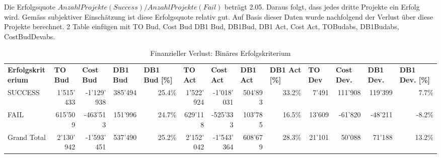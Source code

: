 \newline
Die Erfolgsquote $Anzahl Projekte (Success)/Anzahl Projekte(Fail)$ beträgt 2.05. Daraus folgt, dass jedes dritte Projekte ein Erfolg wird. Gemäss subjektiver Einschätzung ist diese Erfolgsquote relativ gut. Auf Basis dieser Daten wurde nachfolgend der Verlust über diese Projekte berechnet. 
2 Table einfügen mit TO Bud, Cost Bud DB1 Bud, DB1Bud, DB1 Act, Cost Act, TOBudabs, DB1Budabs, CostBudDevabs.
\begin{table}[htbp]
	\centering
	\caption{Finanzieller Verlust: Binäres Erfolgskriterium }
	\begin{tabular}{lrrrrrrrrrrrr}
		\textbf{Erfolgskriterium} & \multicolumn{1}{l}{\textbf{TO Bud}} & \multicolumn{1}{l}{\textbf{Cost Bud}} & \multicolumn{1}{l}{\textbf{DB1 Bud}} & \multicolumn{1}{l}{\textbf{DB1 Bud [\%]}} & \multicolumn{1}{l}{\textbf{TO Act}} & \multicolumn{1}{l}{\textbf{Cost Act}} & \multicolumn{1}{l}{\textbf{DB1 Act}} & \multicolumn{1}{l}{\textbf{DB1 Act [\%]}} & \multicolumn{1}{l}{\textbf{TO Dev}} & \multicolumn{1}{l}{\textbf{Cost Dev.}} & \multicolumn{1}{l}{\textbf{DB1 Dev.}} & \multicolumn{1}{l}{\textbf{DB1 Dev. [\%]}} \\
		SUCCESS & 1'515'433 & -1'129'938 & 385'494 & 25.4\% & 1'522'924 & -1'018'031 & 504'893 & 33.2\% & 7'491 & 111'908 & 119'399 & 7.7\% \\
		FAIL  & 615'509 & -463'513 & 151'996 & 24.7\% & 629'118 & -525'333 & 103'785 & 16.5\% & 13'609 & -61'820 & -48'211 & -8.2\% \\
		Grand Total & 2'130'942 & -1'593'451 & 537'490 & 25.2\% & 2'152'042 & -1'543'364 & 608'679 & 28.3\% & 21'101 & 50'088 & 71'188 & 13.2\% \\
	\end{tabular}%
	\label{tab:addlabel}%
\end{table}%
\newline
